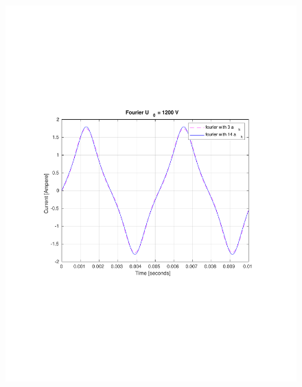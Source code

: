\documentclass[aspectratio=1610]{beamer}
\begin{document}
\begin{frame}
\begin{columns}
\begin{figure}
				\includegraphics[scale=0.4]{figs/fourier comparison 1200.pdf}
			\end{figure}
	\end{columns}
\end{frame}
\end{document}
